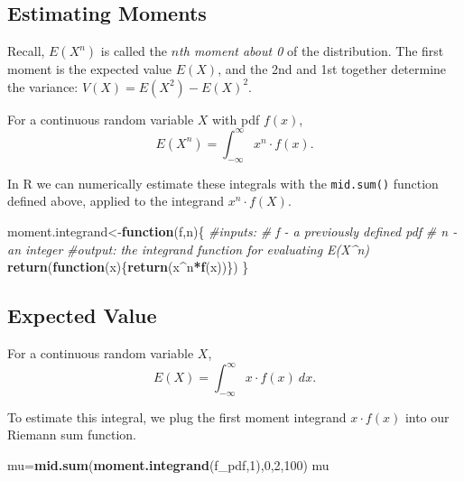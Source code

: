 \documentclass[
]{book}
\newenvironment{Shaded}{\begin{snugshade}}{\end{snugshade}}
\newcommand{\CommentTok}[1]{\textcolor[rgb]{0.56,0.35,0.01}{\textit{#1}}}
\newcommand{\ControlFlowTok}[1]{\textcolor[rgb]{0.13,0.29,0.53}{\textbf{#1}}}
\newcommand{\DecValTok}[1]{\textcolor[rgb]{0.00,0.00,0.81}{#1}}
\newcommand{\FunctionTok}[1]{\textcolor[rgb]{0.13,0.29,0.53}{\textbf{#1}}}
\newcommand{\NormalTok}[1]{#1}
\newcommand{\OtherTok}[1]{\textcolor[rgb]{0.56,0.35,0.01}{#1}}
\newcommand{\SpecialCharTok}[1]{\textcolor[rgb]{0.81,0.36,0.00}{\textbf{#1}}}
\theoremstyle{definition}
\theoremstyle{definition}
\theoremstyle{definition}
\theoremstyle{definition}
\theoremstyle{remark}
\begin{document}
\subsection*{Estimating Moments}\label{estimating-moments}

Recall, \(E(X^n)\) is called the \emph{\(n\)th moment about 0} of the distribution. The first moment is the expected value \(E(X)\), and the 2nd and 1st together determine the variance: \(V(X) = E(X^2)-E(X)^2.\)

For a continuous random variable \(X\) with pdf \(f(x)\), \[E(X^n) = \int_{-\infty}^\infty x^n \cdot f(x).\]

In R we can numerically estimate these integrals with the \texttt{mid.sum()} function defined above, applied to the integrand \(x^n\cdot f(X)\).

\begin{Shaded}
\begin{Highlighting}[]
\NormalTok{moment.integrand}\OtherTok{\textless{}{-}}\ControlFlowTok{function}\NormalTok{(f,n)\{}
  \CommentTok{\#inputs:}
      \CommentTok{\# f {-} a previously defined pdf}
      \CommentTok{\# n {-} an integer}
  \CommentTok{\#output: the integrand function for evaluating E(X\^{}n)}
  \FunctionTok{return}\NormalTok{(}\ControlFlowTok{function}\NormalTok{(x)\{}\FunctionTok{return}\NormalTok{(x}\SpecialCharTok{\^{}}\NormalTok{n}\SpecialCharTok{*}\FunctionTok{f}\NormalTok{(x))\})}
\NormalTok{\}}
\end{Highlighting}
\end{Shaded}

\subsection*{Expected Value}\label{expected-value-1}

For a continuous random variable \(X\), \[E(X)=\int_{-\infty}^{\infty} x \cdot f(x)~dx.\]

To estimate this integral, we plug the first moment integrand \(x \cdot f(x)\) into our Riemann sum function.

\begin{Shaded}
\begin{Highlighting}[]
\NormalTok{mu}\OtherTok{=}\FunctionTok{mid.sum}\NormalTok{(}\FunctionTok{moment.integrand}\NormalTok{(f\_pdf,}\DecValTok{1}\NormalTok{),}\DecValTok{0}\NormalTok{,}\DecValTok{2}\NormalTok{,}\DecValTok{100}\NormalTok{)}
\NormalTok{mu}
\end{Highlighting}
\end{Shaded}
\end{document}
